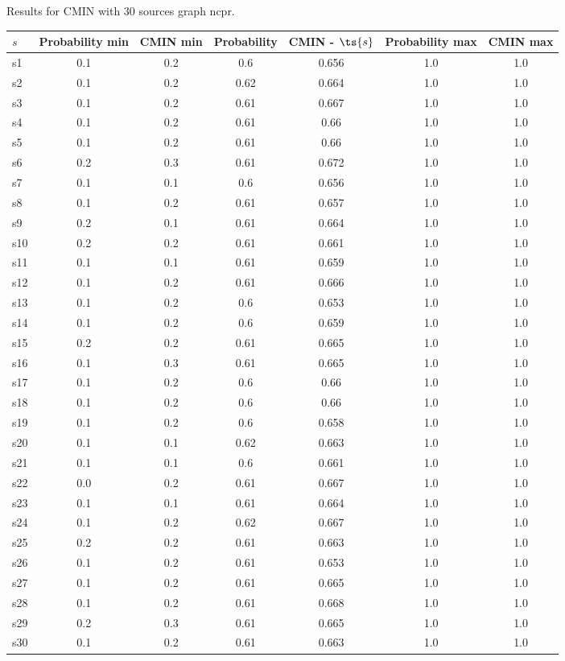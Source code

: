\documentclass{article}
\begin{document}
\noindent Results for CMIN with 30 sources graph ncpr.

\noindent\begin{tabular}{|l|c|c|c|c|c|c|}
\hline
$s$& Probability min & CMIN min & Probability & CMIN - $\ts{s}$ & Probability max & CMIN max\\
\hline
s1 &0.1 & 0.2 & 0.6 & 0.656 & 1.0 & 1.0\\
\hline
s2 &0.1 & 0.2 & 0.62 & 0.664 & 1.0 & 1.0\\
\hline
s3 &0.1 & 0.2 & 0.61 & 0.667 & 1.0 & 1.0\\
\hline
s4 &0.1 & 0.2 & 0.61 & 0.66 & 1.0 & 1.0\\
\hline
s5 &0.1 & 0.2 & 0.61 & 0.66 & 1.0 & 1.0\\
\hline
s6 &0.2 & 0.3 & 0.61 & 0.672 & 1.0 & 1.0\\
\hline
s7 &0.1 & 0.1 & 0.6 & 0.656 & 1.0 & 1.0\\
\hline
s8 &0.1 & 0.2 & 0.61 & 0.657 & 1.0 & 1.0\\
\hline
s9 &0.2 & 0.1 & 0.61 & 0.664 & 1.0 & 1.0\\
\hline
s10 &0.2 & 0.2 & 0.61 & 0.661 & 1.0 & 1.0\\
\hline
s11 &0.1 & 0.1 & 0.61 & 0.659 & 1.0 & 1.0\\
\hline
s12 &0.1 & 0.2 & 0.61 & 0.666 & 1.0 & 1.0\\
\hline
s13 &0.1 & 0.2 & 0.6 & 0.653 & 1.0 & 1.0\\
\hline
s14 &0.1 & 0.2 & 0.6 & 0.659 & 1.0 & 1.0\\
\hline
s15 &0.2 & 0.2 & 0.61 & 0.665 & 1.0 & 1.0\\
\hline
s16 &0.1 & 0.3 & 0.61 & 0.665 & 1.0 & 1.0\\
\hline
s17 &0.1 & 0.2 & 0.6 & 0.66 & 1.0 & 1.0\\
\hline
s18 &0.1 & 0.2 & 0.6 & 0.66 & 1.0 & 1.0\\
\hline
s19 &0.1 & 0.2 & 0.6 & 0.658 & 1.0 & 1.0\\
\hline
s20 &0.1 & 0.1 & 0.62 & 0.663 & 1.0 & 1.0\\
\hline
s21 &0.1 & 0.1 & 0.6 & 0.661 & 1.0 & 1.0\\
\hline
s22 &0.0 & 0.2 & 0.61 & 0.667 & 1.0 & 1.0\\
\hline
s23 &0.1 & 0.1 & 0.61 & 0.664 & 1.0 & 1.0\\
\hline
s24 &0.1 & 0.2 & 0.62 & 0.667 & 1.0 & 1.0\\
\hline
s25 &0.2 & 0.2 & 0.61 & 0.663 & 1.0 & 1.0\\
\hline
s26 &0.1 & 0.2 & 0.61 & 0.653 & 1.0 & 1.0\\
\hline
s27 &0.1 & 0.2 & 0.61 & 0.665 & 1.0 & 1.0\\
\hline
s28 &0.1 & 0.2 & 0.61 & 0.668 & 1.0 & 1.0\\
\hline
s29 &0.2 & 0.3 & 0.61 & 0.665 & 1.0 & 1.0\\
\hline
s30 &0.1 & 0.2 & 0.61 & 0.663 & 1.0 & 1.0\\
\hline
\end{tabular}\\
\end{document}
